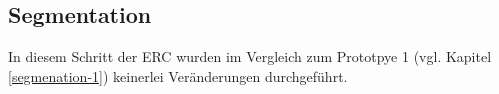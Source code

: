 \subsection{Segmentation} \label{segmenation-4}

In diesem Schritt der ERC wurden im Vergleich zum Prototpye 1 (vgl. Kapitel \ref{segmenation-1}) keinerlei Ver{\"a}nderungen durchgef{\"u}hrt. \\